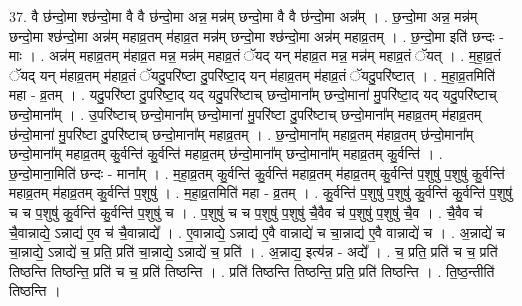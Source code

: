 \documentclass[17pt]{extarticle}
\begin{document}
37. वै छ॑न्दो॒मा श्छ॑न्दो॒मा वै वै छ॑न्दो॒मा अन्न॒ मन्न॑म् छन्दो॒मा वै वै छ॑न्दो॒मा अन्न᳚म् । . छ॒न्दो॒मा अन्न॒ मन्न॑म् छन्दो॒मा श्छ॑न्दो॒मा अन्न॑म् महाव्र॒तम् म॑हाव्र॒त मन्न॑म् छन्दो॒मा श्छ॑न्दो॒मा अन्न॑म् महाव्र॒तम् । . छ॒न्दो॒मा इति॑ छन्दः - माः । . अन्न॑म् महाव्र॒तम् म॑हाव्र॒त मन्न॒ मन्न॑म् महाव्र॒तं ॅयद् यन् म॑हाव्र॒त मन्न॒ मन्न॑म् महाव्र॒तं ॅयत् । . म॒हा॒व्र॒तं ॅयद् यन् म॑हाव्र॒तम् म॑हाव्र॒तं ॅयदु॒परि॑ष्टा दु॒परि॑ष्टा॒द् यन् म॑हाव्र॒तम् म॑हाव्र॒तं ॅयदु॒परि॑ष्टात् । . म॒हा॒व्र॒तमिति॑ महा - व्र॒तम् । . यदु॒परि॑ष्टा दु॒परि॑ष्टा॒द् यद् यदु॒परि॑ष्टाच् छन्दो॒माना᳚म् छन्दो॒माना॑ मु॒परि॑ष्टा॒द् यद् यदु॒परि॑ष्टाच् छन्दो॒माना᳚म् । . उ॒परि॑ष्टाच् छन्दो॒माना᳚म् छन्दो॒माना॑ मु॒परि॑ष्टा दु॒परि॑ष्टाच् छन्दो॒माना᳚म् महाव्र॒तम् म॑हाव्र॒तम् छ॑न्दो॒माना॑ मु॒परि॑ष्टा दु॒परि॑ष्टाच् छन्दो॒माना᳚म् महाव्र॒तम् । . छ॒न्दो॒माना᳚म् महाव्र॒तम् म॑हाव्र॒तम् छ॑न्दो॒माना᳚म् छन्दो॒माना᳚म् महाव्र॒तम् कु॒र्वन्ति॑ कु॒र्वन्ति॑ महाव्र॒तम् छ॑न्दो॒माना᳚म् छन्दो॒माना᳚म् महाव्र॒तम् कु॒र्वन्ति॑ । . छ॒न्दो॒माना॒मिति॑ छन्दः - माना᳚म् । . म॒हा॒व्र॒तम् कु॒र्वन्ति॑ कु॒र्वन्ति॑ महाव्र॒तम् म॑हाव्र॒तम् कु॒र्वन्ति॑ प॒शुषु॑ प॒शुषु॑ कु॒र्वन्ति॑ महाव्र॒तम् म॑हाव्र॒तम् कु॒र्वन्ति॑ प॒शुषु॑ । . म॒हा॒व्र॒तमिति॑ महा - व्र॒तम् । . कु॒र्वन्ति॑ प॒शुषु॑ प॒शुषु॑ कु॒र्वन्ति॑ कु॒र्वन्ति॑ प॒शुषु॑ च च प॒शुषु॑ कु॒र्वन्ति॑ कु॒र्वन्ति॑ प॒शुषु॑ च । . प॒शुषु॑ च च प॒शुषु॑ प॒शुषु॑ चै॒वैव च॑ प॒शुषु॑ प॒शुषु॑ चै॒व । . चै॒वैव च॑ चै॒वान्नाद्ये॒ ऽन्नाद्य॑ ए॒व च॑ चै॒वान्नाद्ये᳚ । . ए॒वान्नाद्ये॒ ऽन्नाद्य॑ ए॒वै वान्नाद्ये॑ च चा॒न्नाद्य॑ ए॒वै वान्नाद्ये॑ च । . अ॒न्नाद्ये॑ च चा॒न्नाद्ये॒ ऽन्नाद्ये॑ च॒ प्रति॒ प्रति॑ चा॒न्नाद्ये॒ ऽन्नाद्ये॑ च॒ प्रति॑ । . अ॒न्नाद्य॒ इत्य॑न्न - अद्ये᳚ । . च॒ प्रति॒ प्रति॑ च च॒ प्रति॑ तिष्ठन्ति तिष्ठन्ति॒ प्रति॑ च च॒ प्रति॑ तिष्ठन्ति । . प्रति॑ तिष्ठन्ति तिष्ठन्ति॒ प्रति॒ प्रति॑ तिष्ठन्ति । . ति॒ष्ठ॒न्तीति॑ तिष्ठन्ति । \newline
\pagebreak
{}
\end{document}
